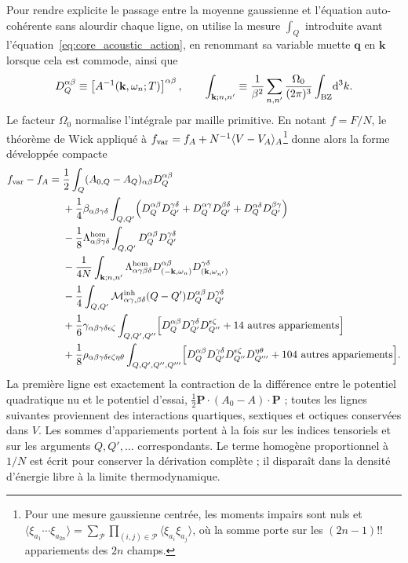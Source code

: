 Pour rendre explicite le passage entre la moyenne gaussienne et l'équation
auto-cohérente sans alourdir chaque ligne, on utilise la mesure $\int_Q$
introduite avant l'équation~\eqref{eq:core_acoustic_action}, en renommant sa
variable muette $\mathbf q$ en $\mathbf k$ lorsque cela est commode, ainsi que
\begin{equation}
D_Q^{\alpha\beta}\equiv
\left[A^{-1}(\mathbf k,\omega_n;T)\right]^{\alpha\beta},
\qquad
\int_{\mathbf k;n,n'}\equiv
\frac{1}{\beta^2}\sum_{n,n'}
\frac{\Omega_0}{(2\pi)^3}\int_{\rm BZ}\!\mathrm d^3k.
\label{eq:core_compact_propagator_notation}
\end{equation}
Le facteur $\Omega_0$ normalise l'intégrale par maille primitive. En notant
$f=F/N$, le théorème de Wick appliqué à
$f_{\rm var}=f_A+N^{-1}\langle V-V_A\rangle_A$\footnote{Pour une mesure
gaussienne centrée, les moments impairs sont nuls et
\(\langle\xi_{a_1}\cdots\xi_{a_{2n}}\rangle
=\sum_{\mathcal P}\prod_{(i,j)\in\mathcal P}
\langle\xi_{a_i}\xi_{a_j}\rangle\), où la somme porte sur les
\((2n-1)!!\) appariements des \(2n\) champs.} donne alors la forme
développée compacte
\begin{equation}
\begin{aligned}
f_{\rm var}-f_A={}&
\frac12\int_Q(A_{0,Q}-A_Q)_{\alpha\beta}D_Q^{\alpha\beta}\\
&+\frac14\beta_{\alpha\beta\gamma\delta}
\int_{Q,Q'}\!\Big(
D_Q^{\alpha\beta}D_{Q'}^{\gamma\delta}
+D_Q^{\alpha\gamma}D_{Q'}^{\beta\delta}
+D_Q^{\alpha\delta}D_{Q'}^{\beta\gamma}\Big)\\
&-\frac18\Lambda^{\rm hom}_{\alpha\beta\gamma\delta}
\int_{Q,Q'}D_Q^{\alpha\beta}D_{Q'}^{\gamma\delta}\\
&-\frac{1}{4N}\int_{\mathbf k;n,n'}
\Lambda^{\rm hom}_{\alpha\gamma\beta\delta}
D_{(-\mathbf k,\omega_n)}^{\alpha\beta}
D_{(\mathbf k,\omega_{n'})}^{\gamma\delta}\\
&-\frac14\int_{Q,Q'}
\mathcal M^{\rm inh}_{\alpha\gamma,\beta\delta}(Q-Q')
D_Q^{\alpha\beta}D_{Q'}^{\gamma\delta}\\
&+\frac16\gamma_{\alpha\beta\gamma\delta\epsilon\zeta}
\int_{Q,Q',Q''}\!\Big[
D_Q^{\alpha\beta}D_{Q'}^{\gamma\delta}D_{Q''}^{\epsilon\zeta}
+\text{14 autres appariements}\Big]\\
&+\frac18\rho_{\alpha\beta\gamma\delta\epsilon\zeta\eta\theta}
\int_{Q,Q',Q'',Q'''}\!\Big[
D_Q^{\alpha\beta}D_{Q'}^{\gamma\delta}
D_{Q''}^{\epsilon\zeta}D_{Q'''}^{\eta\theta}
+\text{104 autres appariements}\Big] .
\end{aligned}
\label{eq:core_variational_wick_expanded}
\end{equation}
La première ligne est exactement la contraction de la différence entre le
potentiel quadratique nu et le potentiel d'essai,
$\tfrac12\mathbf P\mathbin{\cdot}(A_0-A)\mathbin{\cdot}\mathbf P$ ; toutes les
lignes suivantes proviennent des interactions quartiques, sextiques et
octiques conservées dans $V$.
Les sommes d'appariements portent à la fois sur les indices tensoriels et sur
les arguments $Q,Q',\ldots$ correspondants. Le terme homogène proportionnel à
$1/N$ est écrit pour conserver la dérivation complète ; il disparaît dans la
densité d'énergie libre à la limite thermodynamique.

